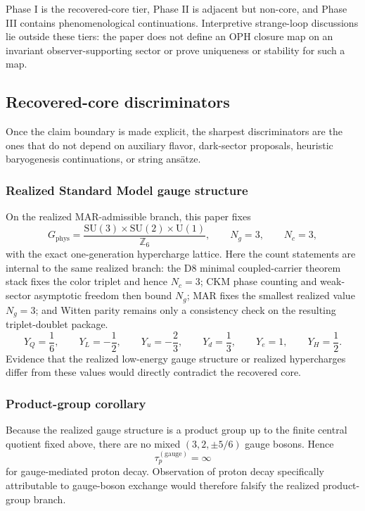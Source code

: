 \documentclass[11pt]{article}
\newcommand{\SU}{\mathrm{SU}}
\newcommand{\U}{\mathrm{U}}
\begin{document}
\endgroup

Phase I is the recovered-core tier, Phase II is adjacent but non-core, and Phase III contains phenomenological continuations. Interpretive strange-loop discussions lie outside these tiers: the paper does not define an OPH closure map on an invariant observer-supporting sector or prove uniqueness or stability for such a map.

\subsection{Recovered-core discriminators}

Once the claim boundary is made explicit, the sharpest discriminators are the ones that do not depend on auxiliary flavor, dark-sector proposals, heuristic baryogenesis continuations, or string ans\"atze.

\subsubsection{Realized Standard Model gauge structure}

On the realized MAR-admissible branch, this paper fixes
\[
G_{\mathrm{phys}}=
\frac{\SU(3)\times\SU(2)\times\U(1)}{\mathbb Z_6},
\qquad
N_g=3,
\qquad
N_c=3,
\]
with the exact one-generation hypercharge lattice. Here the count statements are internal to the same realized branch: the D8 minimal coupled-carrier theorem stack fixes the color triplet and hence \(N_c=3\); CKM phase counting and weak-sector asymptotic freedom then bound \(N_g\); MAR fixes the smallest realized value \(N_g=3\); and Witten parity remains only a consistency check on the resulting triplet-doublet package.
\[
Y_Q=\frac16,\qquad
Y_L=-\frac12,\qquad
Y_u=-\frac23,\qquad
Y_d=\frac13,\qquad
Y_e=1,\qquad
Y_H=\frac12.
\]
Evidence that the realized low-energy gauge structure or realized hypercharges differ from these values would directly contradict the recovered core.

\subsubsection{Product-group corollary}

Because the realized gauge structure is a product group up to the finite central quotient fixed above, there are no mixed \((3,2,\pm 5/6)\) gauge bosons. Hence
\[
\tau_p^{(\mathrm{gauge})}=\infty
\]
for gauge-mediated proton decay. Observation of proton decay specifically attributable to gauge-boson exchange would therefore falsify the realized product-group branch.
\end{document}
